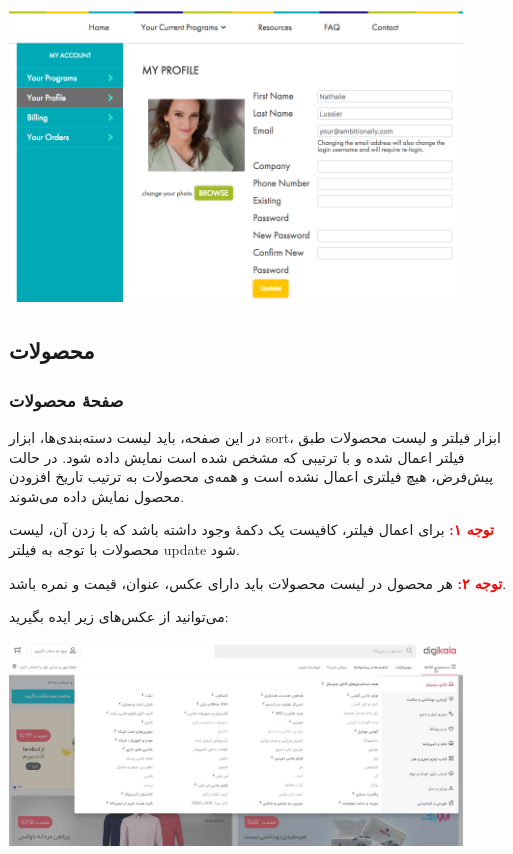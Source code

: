\documentclass[]{article}
\begin{document}
\begin{center}
\includegraphics[width=0.9\textwidth]{images/image15.png}
\end{center}

\newpage

\subsection*{{\titr محصولات}}

\subsubsection*{{\titr صفحهٔ محصولات}}


در این صفحه، باید لیست دسته‌بندی‌ها، ابزار sort، ابزار فیلتر و لیست محصولات طبق فیلتر اعمال شده و با ترتیبی که مشخص شده است نمایش داده شود. در حالت پیش‌فرض، هیچ فیلتری اعمال نشده است و همه‌ی محصولات به ترتیب تاریخ افزودن محصول نمایش داده می‌شوند.


\textbf{\textcolor{red}{توجه ۱:}}
برای اعمال فیلتر، کافیست یک دکمهٔ وجود داشته باشد که با زدن آن، لیست محصولات با توجه به فیلتر update شود.


\textbf{\textcolor{red}{توجه ۲:}}
 هر محصول در لیست محصولات باید دارای عکس، عنوان، قیمت و نمره باشد.


می‌توانید از عکس‌های زیر ایده بگیرید:


\begin{center}
\includegraphics[width=0.9\textwidth]{images/image16.png}
\end{center}
\end{document}
